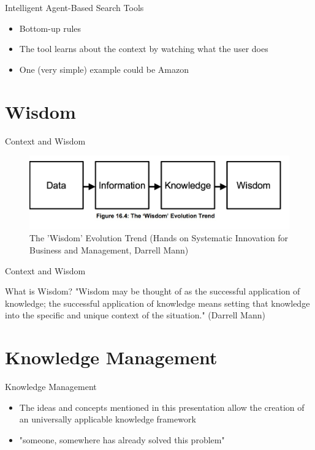 \documentclass{beamer}
\begin{document}
	\begin{frame}{Intelligent Agent-Based Search Tools}
		\begin{itemize}
		    \item Bottom-up rules
		    \item The tool learns about the context by watching what the user does
		    \item One (very simple) example could be Amazon
		\end{itemize}
	\end{frame}

    \section{Wisdom}
	\begin{frame}{Context and Wisdom}
	 \begin{figure}
				\centering
				\includegraphics[scale=0.5]{figure_2.jpg}
				\caption{The 'Wisdom' Evolution Trend (Hands on Systematic Innovation for Business and Management, Darrell Mann)}
	    \end{figure}
	\end{frame}
	
		\begin{frame}{Context and Wisdom}
	 \begin{block}{What is Wisdom?}
	     "Wisdom may be thought of as the successful application of knowledge; the successful application of knowledge means setting that knowledge into the specific and unique context of the situation." (Darrell Mann)
	     
	 \end{block}
	\end{frame}
	
	\section{Knowledge Management}
	\begin{frame}{Knowledge Management}
		\begin{itemize}
		    \item The ideas and concepts mentioned in this presentation allow the creation of an universally applicable knowledge framework
		    \item "someone, somewhere has already solved this problem"
		\end{itemize}
	\end{frame}
	
\end{document}
